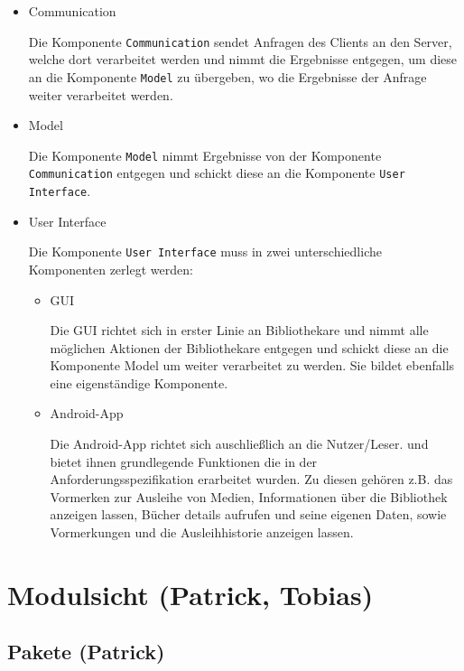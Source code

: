 \documentclass[fontsize=12pt,paper=a4,twoside]{scrartcl}
\begin{document}
\begin{itemize}
\item{Communication}

Die Komponente \texttt{Communication} sendet Anfragen des Clients an den Server, welche dort verarbeitet werden und nimmt die Ergebnisse entgegen, um diese an die Komponente \texttt{Model} zu übergeben, wo die Ergebnisse der Anfrage weiter verarbeitet werden.

\newpage

\item{Model}

Die Komponente \texttt{Model} nimmt Ergebnisse von der Komponente \texttt{Communication} entgegen und schickt diese an die Komponente \texttt{User Interface}. 

\item{User Interface}

Die Komponente \texttt{User Interface} muss in zwei unterschiedliche Komponenten zerlegt werden:
\begin{itemize}
\item{GUI}

Die GUI richtet sich in erster Linie an Bibliothekare und nimmt alle möglichen Aktionen der Bibliothekare entgegen und schickt diese an die Komponente Model um weiter verarbeitet zu werden. Sie bildet ebenfalls eine eigenständige Komponente.

\item{Android-App}

Die Android-App richtet sich auschließlich an die Nutzer/Leser. und bietet ihnen grundlegende Funktionen die in der Anforderungsspezifikation erarbeitet wurden. Zu diesen gehören z.B. das Vormerken zur Ausleihe von Medien, Informationen über die Bibliothek anzeigen lassen, Bücher details aufrufen und seine eigenen Daten, sowie Vormerkungen und die Ausleihhistorie anzeigen lassen.

\end{itemize}

\end{itemize}

\newpage

\section{Modulsicht (Patrick, Tobias)}
\label{sec:modulsicht}

\subsection{Pakete (Patrick)}
\label{sec:pakete}
\end{document}
